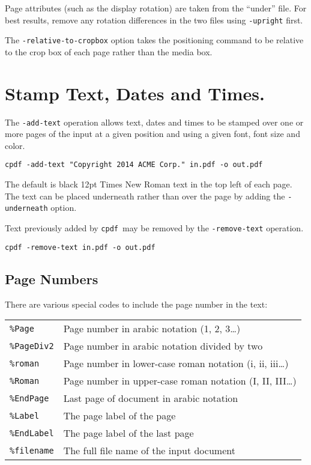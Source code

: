 \documentclass{book}
\newcommand{\cpdf}{\texttt{cpdf}}
\begin{document}
\noindent Page attributes (such as the display rotation) are taken from the ``under''
file. For best results, remove any rotation differences in the two files using
\texttt{-upright} first.

\noindent The \texttt{-relative-to-cropbox} option takes the positioning command to be relative to the crop box of each page rather than the media box.

  \section{Stamp Text, Dates and Times.}
  The \texttt{-add-text} operation allows text, dates and times to be stamped
over one or more pages of the input at a given position and using a given font,
font size and color.
  \begin{framed}
    \small\verb!cpdf -add-text "Copyright 2014 ACME Corp." in.pdf -o out.pdf!
  \end{framed}
  \noindent The default is black 12pt Times New Roman text in the top left of each page. The text can be placed underneath rather than over the page by adding the \texttt{-underneath} option.
  
  Text previously added by \cpdf\ may be removed by the \texttt{-remove-text} operation.
  \begin{framed}
    \small\verb!cpdf -remove-text in.pdf -o out.pdf!
  \end{framed}

  \subsection{Page Numbers}
  There are various special codes to include the page number in the text:

  \vspace{2mm}
  \begin{tabular}{ll}
    \texttt{\%Page} & Page number in arabic notation (1, 2, 3\ldots) \\
    \texttt{\%PageDiv2} & Page number in arabic notation divided by two \\
    \texttt{\%roman} & Page number in lower-case roman notation (i, ii, iii\ldots) \\
    \texttt{\%Roman} & Page number in upper-case roman notation (I, II, III\ldots) \\
    \texttt{\%EndPage} & Last page of document in arabic notation \\
    \texttt{\%Label} & The page label of the page \\
    \texttt{\%EndLabel} & The page label of the last page \\
    \texttt{\%filename} & The full file name of the input document \\
  \end{tabular}
\end{document}
